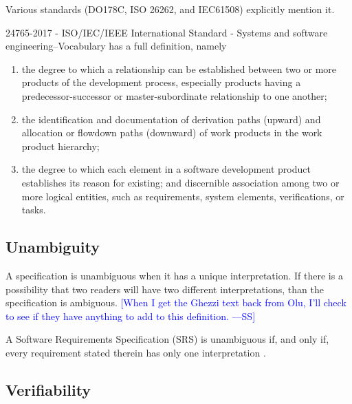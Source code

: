 \documentclass[letterpaper,cleveref]{lipics-v2019}
\newcommand{\authornote}[3]{\textcolor{#1}{[#3 ---#2]}}
\newcommand{\authornote}[3]{}
\newcommand{\wss}[1]{\authornote{blue}{SS}{#1}} %
\theoremstyle{definition}
\begin{document}
Various standards (DO178C, ISO 26262, and IEC61508) explicitly mention it.

24765-2017 - ISO/IEC/IEEE International Standard - Systems and software engineering--Vocabulary
has a full definition, namely
\begin{enumerate}
\item the degree to which a relationship can be established between two or more
products of the development process, especially products having a
predecessor-successor or master-subordinate relationship to one another;
\item
the identification and documentation of derivation paths (upward) and
allocation or flowdown paths (downward) of work products in the work product
hierarchy;
\item the degree to which each element in a software development
product establishes its reason for existing; and discernible association
among two or more logical entities, such as requirements, system elements,
verifications, or tasks.
\end{enumerate}

\subsection{Unambiguity}

A specification is unambiguous when it has a unique interpretation.  If there is
a possibility that two readers will have two different interpretations, than the
specification is ambiguous.  \wss{When I get the Ghezzi text back from Olu, I'll
  check to see if they have anything to add to this definition.}

A Software Requirements Specification (SRS) is unambiguous if, and only if,
every requirement stated therein has only one interpretation \citep{IEEE1998}.

\subsection{Verifiability}
\end{document}
